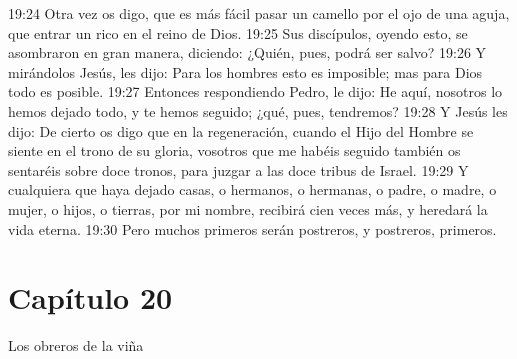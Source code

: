 19:24 Otra vez os digo, que es más fácil pasar un camello por el ojo de una aguja, que entrar un rico en el reino de Dios. 
19:25 Sus discípulos, oyendo esto, se asombraron en gran manera, diciendo: ¿Quién, pues, podrá ser salvo? 
19:26 Y mirándolos Jesús, les dijo: Para los hombres esto es imposible; mas para Dios todo es posible. 
19:27 Entonces respondiendo Pedro, le dijo: He aquí, nosotros lo hemos dejado todo, y te hemos seguido; ¿qué, pues, tendremos? 
19:28 Y Jesús les dijo: De cierto os digo que en la regeneración, cuando el Hijo del Hombre se siente en el trono de su gloria, vosotros que me habéis seguido también os sentaréis sobre doce tronos, para juzgar a las doce tribus de Israel. 
19:29 Y cualquiera que haya dejado casas, o hermanos, o hermanas, o padre, o madre, o mujer, o hijos, o tierras, por mi nombre, recibirá cien veces más, y heredará la vida eterna. 
19:30 Pero muchos primeros serán postreros, y postreros, primeros. 
\section*{Capítulo 20}
Los obreros de la viña 

